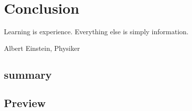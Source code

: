\chapter{Conclusion}
\label{cha:conclusion}

\epigraph{Learning is experience. Everything else is simply information.}{Albert Einstein, Physiker}

\section{summary}
\label{sec:summary}

\lipsum[4]

\section{Preview}
\label{sec:preview}

\lipsum[4]
